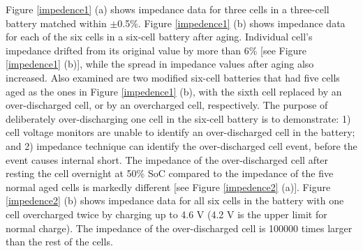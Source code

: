 Figure \ref{impedence1} (a) shows impedance data for three cells in a three-cell battery matched within $\pm$0.5\%. Figure \ref{impedence1} (b) shows impedance data for each of the six cells in a six-cell battery after aging. Individual cell’s impedance drifted from its original value by more than 6\% [see Figure \ref{impedence1} (b)], while the spread in impedance values after aging also increased. Also examined are two modified six-cell batteries that had five cells aged as the ones in Figure \ref{impedence1} (b), with the sixth cell replaced by an over-discharged cell, or by an overcharged cell, respectively. The purpose of deliberately over-discharging one cell in the six-cell battery is to demonstrate: 1) cell voltage monitors are unable to identify an over-discharged cell in the battery; and 2) impedance technique can identify the over-discharged cell event, before the event causes internal short. The impedance of the over-discharged cell after resting the cell overnight at 50\% SoC compared to the impedance of the five normal aged cells is markedly different [see Figure \ref{impedence2} (a)].  Figure \ref{impedence2} (b) shows impedance data for all six cells in the battery with one cell overcharged twice by charging up to 4.6 V (4.2 V is the upper limit for normal charge). The impedance of the over-discharged cell is 100000 times larger than the rest of the cells.






